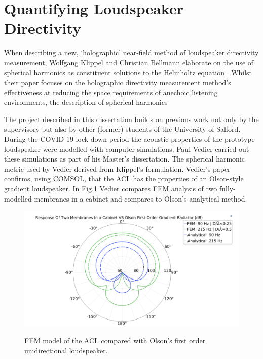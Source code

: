 \documentclass{report}
\begin{document}
    \section{Quantifying Loudspeaker Directivity} 
        When describing a new, `holographic' near-field method of loudspeaker directivity measurement, Wolfgang Klippel and Christian Bellmann elaborate on the use of spherical harmonics as constituent solutions to the Helmholtz equation \cite{klippel2016holographic}.
        Whilst their paper focuses on the holographic directivity measurement method's effectiveness at reducing the space requirements of anechoic listening environments, the description of spherical harmonics
        
        The project described in this dissertation builds on previous work not only by the supervisory but also by other (former) students of the University of Salford.
        During the COVID-19 lock-down period the acoustic properties of the prototype loudspeaker were modelled with computer simulations.
        Paul Vedier carried out these simulations as part of his Master's dissertation.
        The spherical harmonic metric used by Vedier derived from Klippel's formulation.
        Vedier's paper confirms, using COMSOL, that the ACL has the properties of an Olson-style gradient loudspeaker.
        In Fig.\ref{vedierPolar} Vedier compares FEM analysis of two fully-modelled membranes in a cabinet and compares to Olson's analytical method.
        \begin{figure}[H]
            \centering
            \includegraphics[scale=0.5]{figs/vedierPolar.png}
            \caption{FEM model of the ACL compared with Olson's first order unidirectional loudspeaker.}\cite{vedier}
            \label{vedierPolar}
        \end{figure}
\end{document}
